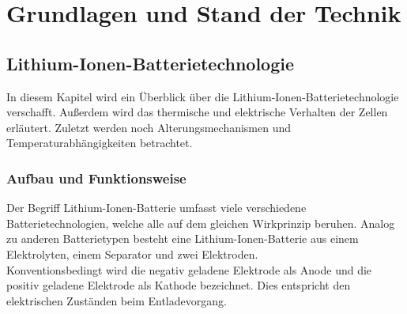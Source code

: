 \section{Grundlagen und Stand der Technik}\label{sec:GrundlagenUSdT}

\subsection{Lithium-Ionen-Batterietechnologie}\label{subsec:LIB}

In diesem Kapitel wird ein Überblick über die Lithium-Ionen-Batterietechnologie verschafft. Außerdem wird das thermische und elektrische Verhalten der Zellen erläutert. Zuletzt werden noch Alterungsmechanismen und Temperaturabhängigkeiten betrachtet.

\subsubsection*{Aufbau und Funktionsweise}\label{subsec*:LIBAufbau}

Der Begriff Lithium-Ionen-Batterie umfasst viele verschiedene Batterietechnologien, welche alle auf dem gleichen Wirkprinzip beruhen. Analog zu anderen Batterietypen besteht eine Lithium-Ionen-Batterie aus einem Elektrolyten, einem Separator und zwei Elektroden.\\
Konventionsbedingt wird die negativ geladene Elektrode als Anode und die positiv geladene Elektrode als Kathode bezeichnet. Dies entspricht den elektrischen Zuständen beim Entladevorgang.\\

